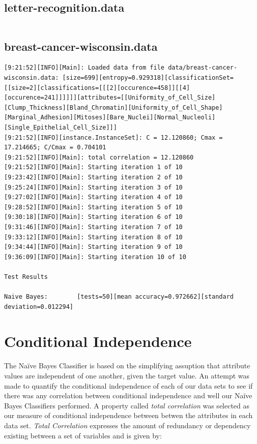 \documentclass[10pt]{report}
\begin{document}
\subsection*{letter-recognition.data}
{\small
\begin{verbatim}

\end{verbatim}
}


\subsection*{breast-cancer-wisconsin.data}
{\small
\begin{verbatim}
[9:21:52][INFO][Main]: Loaded data from file data/breast-cancer-wisconsin.data: [size=699][entropy=0.929318][classificationSet=[[size=2][classifications=[[[2][occurence=458]][[4][occurence=241]]]]]][attributes=[[Uniformity_of_Cell_Size][Clump_Thickness][Bland_Chromatin][Uniformity_of_Cell_Shape][Marginal_Adhesion][Mitoses][Bare_Nuclei][Normal_Nucleoli][Single_Epithelial_Cell_Size]]] 
[9:21:52][INFO][instance.InstanceSet]: C = 12.120860; Cmax = 17.214665; C/Cmax = 0.704101 
[9:21:52][INFO][Main]: total correlation = 12.120860 
[9:21:52][INFO][Main]: Starting iteration 1 of 10 
[9:23:42][INFO][Main]: Starting iteration 2 of 10 
[9:25:24][INFO][Main]: Starting iteration 3 of 10 
[9:27:02][INFO][Main]: Starting iteration 4 of 10 
[9:28:52][INFO][Main]: Starting iteration 5 of 10 
[9:30:18][INFO][Main]: Starting iteration 6 of 10 
[9:31:46][INFO][Main]: Starting iteration 7 of 10 
[9:33:12][INFO][Main]: Starting iteration 8 of 10 
[9:34:44][INFO][Main]: Starting iteration 9 of 10 
[9:36:09][INFO][Main]: Starting iteration 10 of 10 

Test Results

Naive Bayes:		[tests=50][mean accuracy=0.972662][standard deviation=0.012294] 
\end{verbatim}
}


\section{Conditional Independence}
The Na\"{i}ve Bayes Classifier is based on the simplifying assuption
that attribute values are independent of one another, given the target
value. An attempt was made to quantify the conditional independence of
each of our data sets to see if there was any correlation between
conditional independence and well our Na\"{i}ve Bayes Classifiers
performed. A property called \textit{total correlation}
\cite{RefWorks:44} was selected as our measure of conditional
independence between betwen the attributes in each data
set. \textit{Total Correlation} expresses the amount of redundancy or
dependency existing between a set of variables and is given by:
\end{document}

